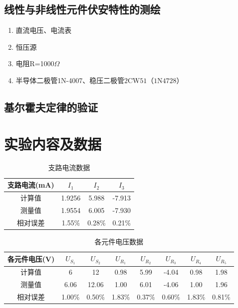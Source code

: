 \documentclass{article}
\begin{document}
\subsection{线性与非线性元件伏安特性的测绘}
\begin{enumerate}
    \item 直流电压、电流表
    \item 恒压源
    \item 电阻R=1000$\Omega$
    \item 半导体二极管1N-4007、稳压二极管\(2\text{CW}51\)（\(1\text{N}4728\)）
    \end{enumerate}
\subsection{基尔霍夫定律的验证}

\section{实验内容及数据}
\begin{longtable}{cccc}
    \caption[Short Caption]{$支路电流数据$}
    \label{table:longtable_example} \\
    \hline
    支路电流(mA) & $I_{1}$     & $I_2$     & $I_3$     \\ \hline 
计算值      & 1.9256 & 5.988  & -7.913 \\ \hline
测量值      & 1.9554 & 6.005  & -7.930 \\ \hline
相对误差     & 1.55\% & 0.28\% & 0.21\% \\\hline
    \hline
\end{longtable}
\begin{longtable}{cccccccc}
    \caption[Short Caption]{$各元件电压数据$}
    \label{table:longtable_example} \\
    \hline
    各元件电压(V) & $U_{S_1}$    & $U_{S_2}$    & $U_{R_1}$    & $U_{R_2}$    & $U_{R_3}$    & $U_{R_4}$    & $U_{R_5}$    \\ \hline
    计算值      & 6     & 12     & 0.98   & 5.99  & -4.04   & 0.98   & 1.98  \\ \hline
    测量值      & 6.06  & 12.06  & 1.00   & 6.01  & -4.06   & 1.00   & 1.96  \\ \hline
    相对误差     & 1.00\% & 0.50\% & 1.83\% & 0.37\% & 0.60\% & 1.83\% & 0.81\% \\ \hline
    \hline
\end{longtable}
\end{document}
